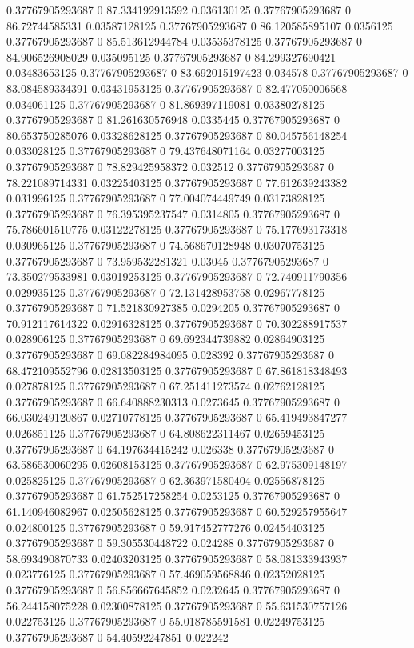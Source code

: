 0.37767905293687 0 87.334192913592 0.036130125
0.37767905293687 0 86.72744585331 0.03587128125
0.37767905293687 0 86.120585895107 0.0356125
0.37767905293687 0 85.513612944784 0.03535378125
0.37767905293687 0 84.906526908029 0.035095125
0.37767905293687 0 84.299327690421 0.03483653125
0.37767905293687 0 83.692015197423 0.034578
0.37767905293687 0 83.084589334391 0.03431953125
0.37767905293687 0 82.477050006568 0.034061125
0.37767905293687 0 81.869397119081 0.03380278125
0.37767905293687 0 81.261630576948 0.0335445
0.37767905293687 0 80.653750285076 0.03328628125
0.37767905293687 0 80.045756148254 0.033028125
0.37767905293687 0 79.437648071164 0.03277003125
0.37767905293687 0 78.829425958372 0.032512
0.37767905293687 0 78.221089714331 0.03225403125
0.37767905293687 0 77.612639243382 0.031996125
0.37767905293687 0 77.004074449749 0.03173828125
0.37767905293687 0 76.395395237547 0.0314805
0.37767905293687 0 75.786601510775 0.03122278125
0.37767905293687 0 75.177693173318 0.030965125
0.37767905293687 0 74.568670128948 0.03070753125
0.37767905293687 0 73.959532281321 0.03045
0.37767905293687 0 73.350279533981 0.03019253125
0.37767905293687 0 72.740911790356 0.029935125
0.37767905293687 0 72.131428953758 0.02967778125
0.37767905293687 0 71.521830927385 0.0294205
0.37767905293687 0 70.912117614322 0.02916328125
0.37767905293687 0 70.302288917537 0.028906125
0.37767905293687 0 69.692344739882 0.02864903125
0.37767905293687 0 69.082284984095 0.028392
0.37767905293687 0 68.472109552796 0.02813503125
0.37767905293687 0 67.861818348493 0.027878125
0.37767905293687 0 67.251411273574 0.02762128125
0.37767905293687 0 66.640888230313 0.0273645
0.37767905293687 0 66.030249120867 0.02710778125
0.37767905293687 0 65.419493847277 0.026851125
0.37767905293687 0 64.808622311467 0.02659453125
0.37767905293687 0 64.197634415242 0.026338
0.37767905293687 0 63.586530060295 0.02608153125
0.37767905293687 0 62.975309148197 0.025825125
0.37767905293687 0 62.363971580404 0.02556878125
0.37767905293687 0 61.752517258254 0.0253125
0.37767905293687 0 61.140946082967 0.02505628125
0.37767905293687 0 60.529257955647 0.024800125
0.37767905293687 0 59.917452777276 0.02454403125
0.37767905293687 0 59.305530448722 0.024288
0.37767905293687 0 58.693490870733 0.02403203125
0.37767905293687 0 58.081333943937 0.023776125
0.37767905293687 0 57.469059568846 0.02352028125
0.37767905293687 0 56.856667645852 0.0232645
0.37767905293687 0 56.244158075228 0.02300878125
0.37767905293687 0 55.631530757126 0.022753125
0.37767905293687 0 55.018785591581 0.02249753125
0.37767905293687 0 54.40592247851 0.022242
